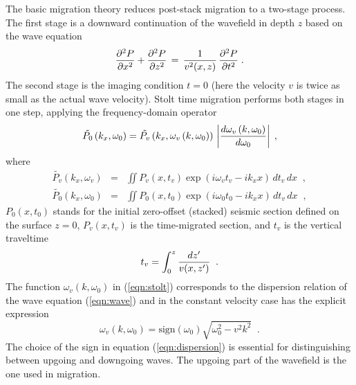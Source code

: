 The basic migration theory reduces post-stack migration to a two-stage
process.  The first stage is a downward continuation of the wavefield
in depth $z$ based on the wave equation
\begin{equation}
{\partial^2 P \over \partial x^2} +
{\partial^2 P \over \partial z^2}  \, = \,{1 \over {v^2(x,z)}}\,
{\partial^2 P \over \partial t^2}\;. 
\label{eqn:wave} 
\end{equation}
The second stage is the imaging condition $t=0$ (here the velocity $v$
is twice as small as the actual wave velocity).  Stolt time migration
performs both stages in one step, applying the frequency-domain
operator
\begin{equation}
\tilde{P_0}\left(k_x, \omega_0\right)=
\tilde{P_v}\left(k_x, \omega_v \left(k,\omega_0 \right)\right) 
\,\left| {{d\omega_v \left(k,\omega_0\right)}\over{d\omega_0}}\right|\;,
\label{eqn:stolt} 
\end{equation}
where
\begin{eqnarray*}
\tilde{P_v}\left(k_x, \omega_v\right) & = & \iint P_v\left(x, t_v\right)
\exp{\left(i \omega_v t_v - i k_x x \right)} \,dt_v\, dx \;\;,  \\
\tilde{P_0}\left(k_x, \omega_0\right) & = & \iint P_0\left(x, t_0\right)
\exp{\left(i \omega_0 t_0 - i k_x x \right)} \,dt_v\, dx \;\;, 
\end{eqnarray*}
$P_0\left(x, t_0\right)$ stands for the initial zero-offset (stacked)
seismic 
section defined on the surface $z=0$,  
$P_v\left(x, t_v\right)$ is the time-migrated section, and $t_v$ is
the vertical traveltime
\begin{equation}
t_v=\int_{0}^{z}{dz' \over {v(x,z')}}\;\;.
\label{eqn:tv} 
\end{equation}
The function $\omega_v \left(k,\omega_0 \right)$ in (\ref{eqn:stolt})
corresponds to the dispersion relation of the wave equation
(\ref{eqn:wave}) and in the constant velocity case has the explicit
expression
\begin{equation}
\omega_v \left(k,\omega_0 \right)=\mbox{sign}\left(\omega_0\right)
\sqrt{\omega_0^2 - v^2 k^2}\;\;.
\label{eqn:dispersion} 
\end{equation}
The choice of the sign in equation (\ref{eqn:dispersion}) is essential
for distinguishing between upgoing and downgoing waves. The upgoing
part of the wavefield is the one used in migration.


